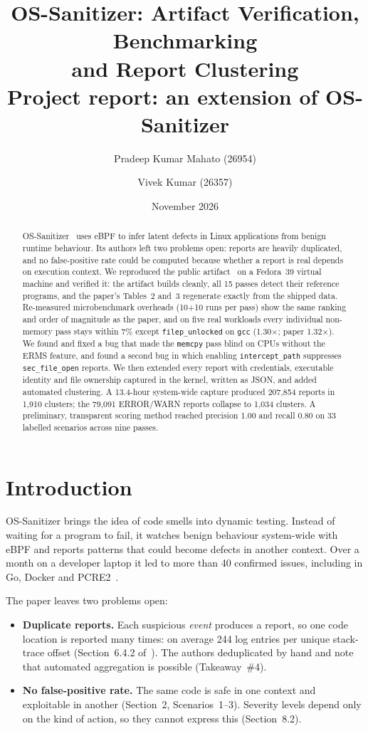 \documentclass[11pt,a4paper]{article}
\title{\textbf{OS-Sanitizer: Artifact Verification, Benchmarking\\and Report Clustering}\\[4pt]
\large Project report: an extension of OS-Sanitizer}
\author{Pradeep Kumar Mahato (26954) \and Vivek Kumar (26357)}
\date{November 2026}
\newcommand{\pass}[1]{\texttt{#1}}
\begin{document}
\maketitle

\begin{abstract}
OS-Sanitizer~\cite{ossan} uses eBPF to infer latent defects in Linux applications from benign
runtime behaviour. Its authors left two problems open: reports are heavily duplicated, and no
false-positive rate could be computed because whether a report is real depends on execution context.
We reproduced the public artifact~\cite{artifact} on a Fedora~39 virtual machine and verified it:
the artifact builds cleanly, all 15 passes detect their reference programs, and the paper's
Tables~2 and~3 regenerate exactly from the shipped data. Re-measured microbenchmark overheads
(10+10 runs per pass) show the same ranking and order of magnitude as the paper, and on five real
workloads every individual non-memory pass stays within 7\% except \pass{filep\_unlocked} on
\texttt{gcc} (1.30$\times$; paper 1.32$\times$). We found and fixed a bug that made the
\pass{memcpy} pass blind on CPUs without the ERMS feature, and found a second bug in which enabling
\pass{intercept\_path} suppresses \pass{sec\_file\_open} reports. We then extended every report with
credentials, executable identity and file ownership captured in the kernel, written as JSON, and
added automated clustering. A 13.4-hour system-wide capture produced 207{,}854 reports in 1{,}910
clusters; the 79{,}091 ERROR/WARN reports collapse to 1{,}034 clusters. A preliminary,
transparent scoring method reached precision 1.00 and recall 0.80 on 33 labelled scenarios across
nine passes.
\end{abstract}

\section{Introduction}

OS-Sanitizer brings the idea of code smells into dynamic testing. Instead of waiting for a program
to fail, it watches benign behaviour system-wide with eBPF and reports patterns that could become
defects in another context. Over a month on a developer laptop it led to more than 40 confirmed
issues, including in Go, Docker and PCRE2~\cite{ossan}.

The paper leaves two problems open:
\begin{itemize}
  \item \textbf{Duplicate reports.} Each suspicious \emph{event} produces a report, so one code
  location is reported many times: on average 244 log entries per unique stack-trace offset
  (Section~6.4.2 of~\cite{ossan}). The authors deduplicated by hand and note that automated
  aggregation is possible (Takeaway~\#4).
  \item \textbf{No false-positive rate.} The same code is safe in one context and exploitable in
  another (Section~2, Scenarios~1--3). Severity levels depend only on the kind of action, so they
  cannot express this (Section~8.2).
\end{itemize}
\end{document}
